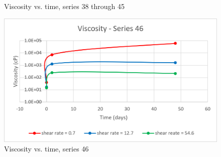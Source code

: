 \begin{appendices}
\begin{figure}
{\begin{subfigure}[b]{0.6\textwidth}
     \end{subfigure}
    }\\
    \\
        \caption{Viscosity vs. time, series 38 through 45}
        \label{fig:visc9-16}
\end{figure}


\begin{figure}
         \centering
         \includegraphics[width=.65\textwidth]{img/visc/46.png}
         \caption{Viscosity vs. time, series 46}
         \label{fig:visc46}
\end{figure}


\end{appendices}
